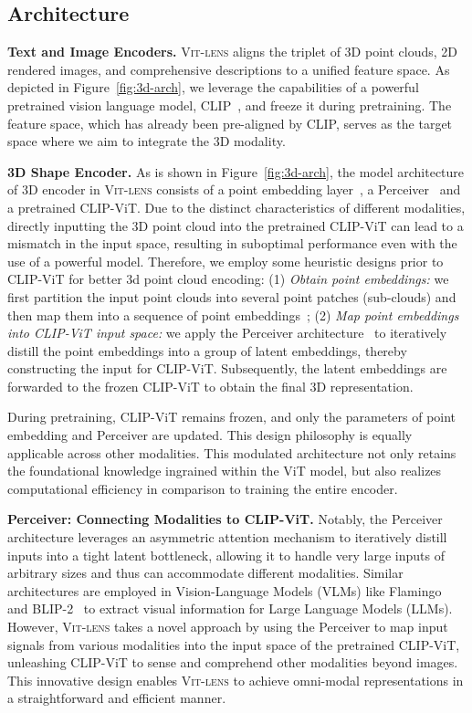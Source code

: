 \documentclass{article}
\newcommand{\clipvit}{CLIP-ViT\xspace}
\newcommand{\vit}{ViT\xspace}
\newcommand{\methodname}{{\scshape Vit-lens}\xspace}
\begin{document}
\subsection{Architecture}
\textbf{Text and Image Encoders.} \methodname aligns the triplet of 3D point clouds, 2D rendered images, and comprehensive descriptions to a unified feature space. As depicted in Figure~\ref{fig:3d-arch}, we leverage the capabilities of a powerful pretrained vision language model, CLIP~\cite{openai_clip,cherti2022openclip}, and freeze it during pretraining. The feature space, which has already been pre-aligned by CLIP, serves as the target space where we aim to  integrate the 3D modality.

\textbf{3D Shape Encoder.} As is shown in Figure~\ref{fig:3d-arch}, the model architecture of 3D encoder in \methodname consists of a point embedding layer~\cite{yu2022pointbert}, a Perceiver~\cite{jaegle2021perceiver} and a pretrained \clipvit. 
Due to the distinct characteristics of different modalities, directly inputting the 3D point cloud into the pretrained \clipvit can lead to a mismatch in the input space, resulting in suboptimal performance even with the use of a powerful model.
Therefore, we employ some heuristic designs prior to \clipvit for better 3d point cloud encoding: (1) \textit{Obtain point embeddings:} we first partition the input point clouds into several point patches (sub-clouds) and then map them into a sequence of point embeddings~\cite{yu2022pointbert}; (2) \textit{Map point embeddings into \clipvit input space:} we apply the Perceiver architecture~\cite{jaegle2021perceiver} to iteratively distill the point embeddings into a group of latent embeddings, thereby constructing the input for \clipvit.
Subsequently, the latent embeddings are forwarded to the frozen \clipvit to obtain the final 3D representation.

During pretraining, \clipvit remains frozen, and only the parameters of point embedding and Perceiver are updated. This design philosophy is equally applicable across other modalities.  This modulated architecture not only retains the foundational knowledge ingrained within the \vit model, but also realizes computational efficiency in comparison to training the entire encoder.

\textbf{Perceiver: Connecting Modalities to \clipvit.} Notably, the Perceiver architecture leverages an asymmetric attention mechanism to iteratively distill inputs into a tight latent bottleneck, allowing it to handle very large inputs of arbitrary sizes and thus can accommodate different modalities.  Similar architectures are employed in Vision-Language Models (VLMs) like Flamingo~\cite{alayrac2022flamingo} and BLIP-2~\cite{blip2} to extract visual information for Large Language Models (LLMs). 
However, \methodname takes a novel approach by using the Perceiver to map input signals from various modalities into the input space of the pretrained \clipvit, unleashing \clipvit to sense and comprehend other modalities beyond images. This innovative design enables \methodname to achieve omni-modal representations in a straightforward and efficient manner.
\end{document}
